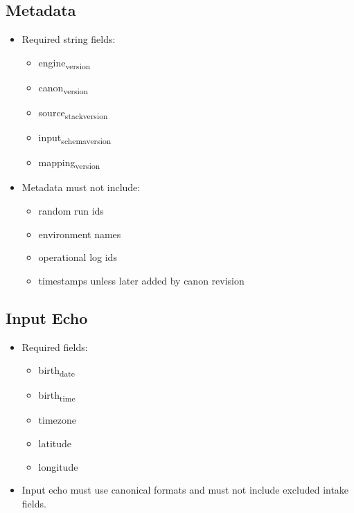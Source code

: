 \documentclass[11pt]{article}
\begin{document}
\subsection{Metadata}
\label{sec:org244b4ed}
\begin{itemize}
\item Required string fields:
\begin{itemize}
\item engine\textsubscript{version}
\item canon\textsubscript{version}
\item source\textsubscript{stack}\textsubscript{version}
\item input\textsubscript{schema}\textsubscript{version}
\item mapping\textsubscript{version}
\end{itemize}
\item Metadata must not include:
\begin{itemize}
\item random run ids
\item environment names
\item operational log ids
\item timestamps unless later added by canon revision
\end{itemize}
\end{itemize}
\subsection{Input Echo}
\label{sec:org0e07a79}
\begin{itemize}
\item Required fields:
\begin{itemize}
\item birth\textsubscript{date}
\item birth\textsubscript{time}
\item timezone
\item latitude
\item longitude
\end{itemize}
\item Input echo must use canonical formats and must not include excluded intake fields.
\end{itemize}
\end{document}
